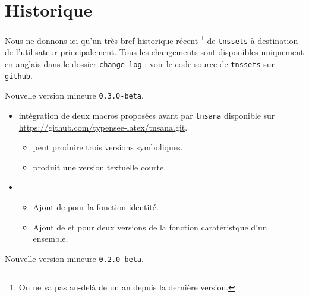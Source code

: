 \documentclass[12pt,a4paper]{article}
\begin{document}
\newpage

\section{Historique}

Nous ne donnons ici qu'un très bref historique récent
\footnote{
	On ne va pas au-delà de un an depuis la dernière version.
}
de \verb+tnssets+ à destination de l'utilisateur principalement.
Tous les changements sont disponibles uniquement en anglais dans le dossier \verb+change-log+ : voir le code source de \verb+tnssets+ sur \verb+github+.

\begin{description}

    \medskip
    \item[2020-08-05] Nouvelle version mineure \verb+0.3.0-beta+.
    
    \begin{itemize}[itemsep=.5em]
        \item {}
              intégration de deux macros proposées avant par \verb#tnsana# disponible sur \url{https://github.com/typensee-latex/tnsana.git}.
    
        \begin{itemize}[itemsep=.5em]
            \item {} peut produire trois versions symboliques.
    
            \item {} produit une version textuelle courte.
        \end{itemize}
    
    
        \item {}
    
        \begin{itemize}[itemsep=.5em]
            \item Ajout de  pour la fonction identité.
    
            \item Ajout de  et  pour deux versions de la fonction caratéristque d'un ensemble.
        \end{itemize}
    \end{itemize}
    
    \separation

    \medskip
    \item[2020-07-30] Nouvelle version mineure \verb+0.2.0-beta+.
    

\end{description}
\end{document}

